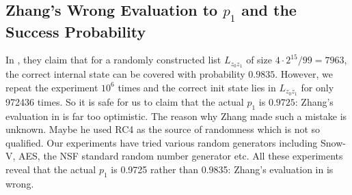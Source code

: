 \subsection{Zhang's Wrong Evaluation to $p_1$ and the Success Probability}\label{sec:ZhangWrongP1}
In \cite{AC:Zhang19}, they claim that for a randomly constructed list $L_{z_0z_1}$ of size $4\cdot 2^{15}/99=7963$, the correct internal state can be covered with probability $0.9835$.
However, we repeat the experiment $10^6$ times and the correct init state lies in $L_{z_0z_1}$ for only 972436 times.
So it is safe for us to claim that the actual $p_1$ is $0.9725$: Zhang's evaluation in \cite{AC:Zhang19} is far too optimistic.
The reason why Zhang made such a mistake is unknown.
Maybe he used RC4 as the source of randomness which is not so qualified.
Our experiments have tried various random generators including Snow-V, AES, the NSF standard random number generator etc.
All these experiments reveal that the actual $p_1$ is 0.9725 rather than 0.9835: Zhang's evaluation in \cite{AC:Zhang19} is wrong.

